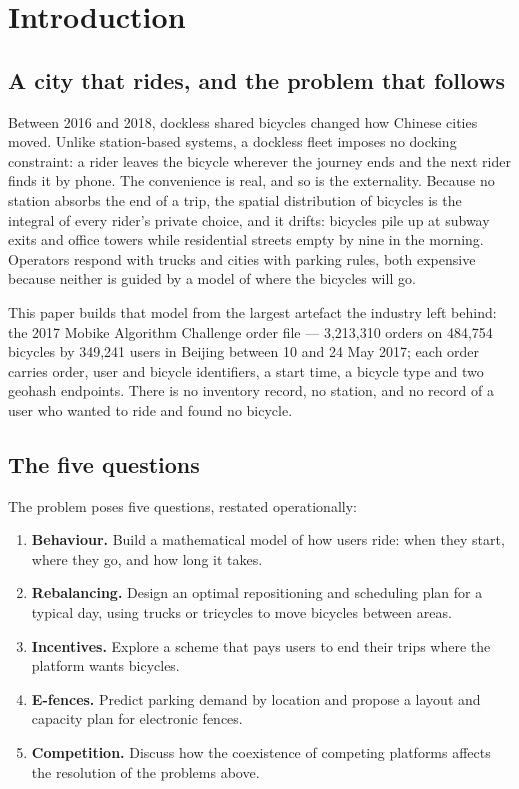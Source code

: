 \section{Introduction}

\subsection{A city that rides, and the problem that follows}

Between 2016 and 2018, dockless shared bicycles changed how Chinese cities moved.
Unlike station-based systems, a dockless fleet imposes no docking constraint: a rider
leaves the bicycle wherever the journey ends and the next rider finds it by phone. The
convenience is real, and so is the
externality. Because no station absorbs the end of a trip, the spatial distribution of
bicycles is the integral of every rider's private choice, and it drifts: bicycles pile
up at subway exits and office towers while residential streets empty by nine in the
morning. Operators respond with trucks and cities with parking rules, both expensive
because neither is guided by a model of where the bicycles will go.

This paper builds that model from the largest artefact the industry left behind: the
2017 Mobike Algorithm Challenge order file --- 3,213,310 orders on 484,754
bicycles by 349,241 users in Beijing between 10 and 24 May 2017; each order carries
order, user and bicycle identifiers, a start time, a bicycle type and two geohash
endpoints.
There is no inventory record, no station, and no record of a user who wanted to ride
and found no bicycle.

\subsection{The five questions}

The problem poses five questions, restated operationally:

\begin{enumerate}[label=\textbf{Q\arabic*.},leftmargin=2.2em]
\item \textbf{Behaviour.} Build a mathematical model of how users ride: when they
  start, where they go, and how long it takes.
\item \textbf{Rebalancing.} Design an optimal repositioning and scheduling plan for
  a typical day, using trucks or tricycles to move bicycles between areas.
\item \textbf{Incentives.} Explore a scheme that pays users to end their trips where
  the platform wants bicycles.
\item \textbf{E-fences.} Predict parking demand by location and propose a layout and
  capacity plan for electronic fences.
\item \textbf{Competition.} Discuss how the coexistence of competing platforms
  affects the resolution of the problems above.
\end{enumerate}

